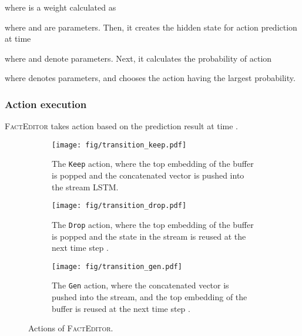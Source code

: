 \documentclass[11pt,a4paper]{article}
\begin{document}
where  is a weight calculated as

where  and  are parameters. Then, it creates the hidden state  for action prediction at time 

where  and  denote parameters. Next, it calculates the probability of action 

where  denotes parameters, and chooses the action having the largest probability.

\subsubsection*{Action execution}

\textsc{FactEditor} takes action based on the prediction result at time .

\begin{figure}[t]
    \centering
    \begin{subfigure}[b]{0.99\linewidth}
        \centering
        \texttt{[image: fig/transition\_keep.pdf]}
        \caption{The \texttt{Keep} action, where the top embedding of the buffer  is popped and the concatenated vector  is pushed into the stream \textsc{LSTM}.}
        \label{fig:keep}
    \end{subfigure}
    \hfill
    \begin{subfigure}[b]{0.99\linewidth}
        \centering
        \texttt{[image: fig/transition\_drop.pdf]}
        \caption{The \texttt{Drop} action, where the top embedding of the buffer  is popped and the state in the stream is reused at the next time step .}
        \label{fig:drop}
    \end{subfigure}
    \hfill
    \begin{subfigure}[b]{0.99\linewidth}
        \centering
        \texttt{[image: fig/transition\_gen.pdf]}
        \caption{The \texttt{Gen} action, where the concatenated vector  is pushed into the stream, and the top embedding of the buffer is reused at the next time step .}
        \label{fig:gen}
    \end{subfigure}
    \caption{Actions of \textsc{FactEditor}.}
    \label{fig:model}
\end{figure}
\end{document}
